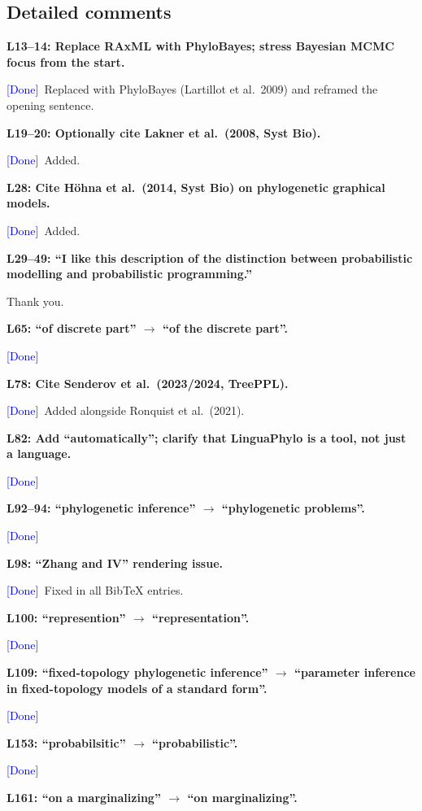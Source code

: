 \documentclass[11pt]{article}
\newcommand{\comment}[1]{\medskip\noindent\textbf{#1}\medskip}
\newcommand{\response}[1]{\noindent #1\medskip}
\newcommand{\done}{\textcolor{blue}{[Done]}}
\begin{document}
\subsection*{Detailed comments}

\comment{L13--14: Replace RAxML with PhyloBayes; stress Bayesian MCMC focus from the start.}

\response{\done\ Replaced with PhyloBayes (Lartillot et al.\ 2009) and reframed the opening sentence.}

\comment{L19--20: Optionally cite Lakner et al.\ (2008, Syst Bio).}

\response{\done\ Added.}

\comment{L28: Cite H\"ohna et al.\ (2014, Syst Bio) on phylogenetic graphical models.}

\response{\done\ Added.}

\comment{L29--49: ``I like this description of the distinction between probabilistic modelling and probabilistic programming.''}

\response{Thank you.}

\comment{L65: ``of discrete part'' $\to$ ``of the discrete part''.}

\response{\done}

\comment{L78: Cite Senderov et al.\ (2023/2024, TreePPL).}

\response{\done\ Added alongside Ronquist et al.\ (2021).}

\comment{L82: Add ``automatically''; clarify that LinguaPhylo is a tool, not just a language.}

\response{\done}

\comment{L92--94: ``phylogenetic inference'' $\to$ ``phylogenetic problems''.}

\response{\done}

\comment{L98: ``Zhang and IV'' rendering issue.}

\response{\done\ Fixed in all BibTeX entries.}

\comment{L100: ``represention'' $\to$ ``representation''.}

\response{\done}

\comment{L109: ``fixed-topology phylogenetic inference'' $\to$ ``parameter inference in fixed-topology models of a standard form''.}

\response{\done}

\comment{L153: ``probabilsitic'' $\to$ ``probabilistic''.}

\response{\done}

\comment{L161: ``on a marginalizing'' $\to$ ``on marginalizing''.}
\end{document}
